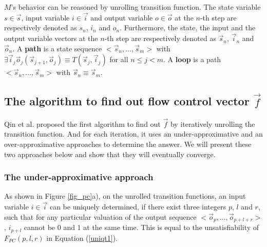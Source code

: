 \documentclass[runningheads,a4paper,orivec]{llncs}
\begin{document}
$M$'s behavior can be reasoned by unrolling transition function.
The state variable $s\in\vec{s}$, input variable $i\in\vec{i}$ and output variable $o\in\vec{o}$ at the $n$-th step 
are respectively denoted as $s_n$, $i_n$ and $o_n$.
Furthermore,
the state, the input and the output variable vectors at the $n$-th step are respectively denoted as $\vec{s}_n$, $\vec{i}_n$ and $\vec{o}_n$.
A \textbf{path} is a state sequence $<\vec{s}_n,\dots,\vec{s}_m>$ with $\exists \vec{i}_j\vec{o}_j (\vec{s}_{j+1},\vec{o}_j)\equiv T(\vec{s}_j,\vec{i}_j)$ for all $n\le j< m$.
A \textbf{loop} is a path $<\vec{s}_n,\dots,\vec{s}_m>$ with $\vec{s}_n\equiv \vec{s}_m$.



\subsection{The algorithm to find out flow control vector $\vec{f}$}\label{subsec_chkextdec}


Qin et al. \cite{QinTODAES15} proposed the first algorithm
to find out $\vec{f}$ by iteratively unrolling the transition function.
And for each iteration,
it uses an under-approximative and an over-approximative approaches to determine the answer.
We will present these two approaches below and show 
that they will eventually converge.

\subsubsection{The under-approximative approach}\label{subsub_sound}
As shown in Figure \ref{fig_pc}a),
on the unrolled transition functions,
an input variable $i\in\vec{i}$ can be uniquely determined,
if there exist three integers $p$, $l$ and $r$,
such that for any particular valuation of the output sequence $<\vec{o}_p,\dots,\vec{o}_{p+l+r}>$,
$i_{p+l}$ cannot be 0 and 1 at the same time.
This is equal to the unsatisfiability of $F_{PC}(p,l,r)$ in Equation (\ref{uniqt1}).
\end{document}
